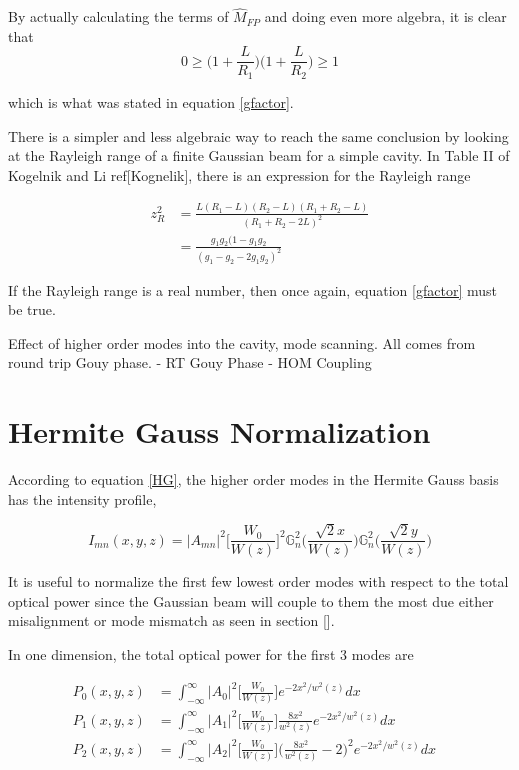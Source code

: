 \begin{appendices}
	By actually calculating the terms of $\hat{M}_{FP}$ and doing even more algebra, it is clear that 
	\begin{equation}
	0 \geq \bigg(1+\frac{L}{R_1}\bigg) \bigg(1+\frac{L}{R_2}\bigg) \geq 1
	\end{equation}
	
	which is what was stated in equation \ref{gfactor}.
	
	There is a simpler and less algebraic way to reach the same conclusion by looking at the Rayleigh range of a finite Gaussian beam for a simple cavity.   In Table II of Kogelnik and Li ref[Kognelik], there is an expression for the Rayleigh range
	
	\begin{equation}
	\begin{aligned}
	z_{R}^2 &= \frac{L (R_1-L) (R_2-L) (R_1+R_2 - L) }  {(R_1+R_2-2L)^2}\\
			&= \frac{g_1 g_2 (1-g_1 g_2}{(g_1 - g_2 - 2 g_1 g_2)^2}
	\end{aligned}
	\end{equation}
	
	If the Rayleigh range is a real number, then once again, equation \ref{gfactor} must be true.
	
	
	Effect of higher order modes into the cavity, mode 		scanning. All comes from round trip Gouy phase.
	- RT Gouy Phase
	- HOM Coupling
	
	\chapter{Hermite Gauss Normalization}
	According to equation \ref{HG}, the higher order modes in the Hermite Gauss basis has the intensity profile,
	
	\begin{equation}
		I_{mn} (x,y,z) = \vert A_{mn} \vert^2 \bigg[ \frac{W_0}{W(z)} \bigg]^2  \mathbb{G}^2_n\Bigg( \frac{\sqrt{2}x}{W(z)} \Bigg) \mathbb{G}^2_n\Bigg( \frac{\sqrt{2}y}{W(z)} \Bigg)
	\end{equation}

	It is useful to normalize the first few lowest order modes with respect to the total optical power since the Gaussian beam will couple to them the most due either misalignment or mode mismatch as seen in section [].
	
	In one dimension, the total optical power for the first 3 modes are
	
	\begin{equation}
	\label{HGNormalInt1D}
	\begin{aligned}
		P_{0}(x,y,z) 	& 	=	\int_{-\infty}^{\infty}  \vert A_{0} \vert^2   \bigg[ \frac{W_0}{W(z)} \bigg] e^{-2x^2/w^2(z)} dx	&
	\\	P_{1}(x,y,z)	&	=	\int_{-\infty}^{\infty}  \vert A_{1} \vert^2  \bigg[ \frac{W_0}{W(z)} \bigg] \frac{8x^2}{w^2(z)} 	
								e^{-2x^2/w^2(z)}dx &
	\\	P_{2}(x,y,z)	&	= 	\int_{-\infty}^{\infty}  \vert A_{2} \vert^2   \bigg[ \frac{W_0}{W(z)} \bigg] \bigg(\frac{8x^2}{w^2(z)}	-2\bigg)^2e^{-2x^2/w^2(z)}dx
	\end{aligned}
	\end{equation}
	

\end{appendices}
